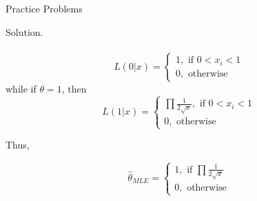 \documentclass[11pt,fleqn]{book} %
\begin{document}
\begin{section}{Practice Problems}
\begin{problem}
	Solution.\\
	\\
	$$ L(0|x) = \begin{cases} 1,\text{ if } 0<x_i<1 \\ 0, \text{ otherwise} \end{cases}$$
	while if $\theta=1$, then
	$$ L(1|x) = \begin{cases} \prod \frac{1}{2\sqrt{x}},\text{ if } 0<x_i<1 \\ 0, \text{ otherwise} \end{cases}$$

	Thus, 

	$$\hat{\theta}_{MLE} = \begin{cases} 1,\text{ if } \prod \frac{1}{2\sqrt{x}}\ \\ 0, \text{ otherwise} \end{cases} $$
		
	\end{problem}
\end{section}








\end{document}
